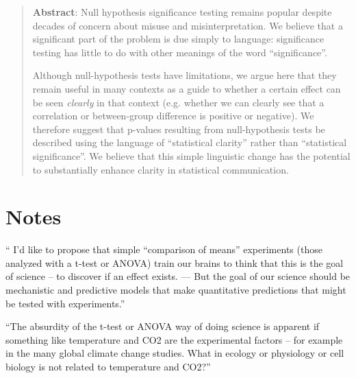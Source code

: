 \begin{abstract}

\textbf{Abstract}: Null hypothesis significance testing remains popular despite decades of concern about misuse and misinterpretation.
We believe that a significant  part of the problem is due simply to language: significance testing has little to do with other meanings of the word ``significance''. 

Although null-hypothesis tests have limitations, we argue here that they remain useful in many contexts as a guide to whether a certain effect can be seen \emph{clearly} in that context (e.g.
whether we can clearly see that a correlation or between-group difference is positive or negative).
We therefore suggest that p-values resulting from null-hypothesis tests be described using the language of ``statistical clarity'' rather than ``statistical significance''.
We believe that this simple linguistic change has the potential to substantially enhance clarity in statistical communication.

\end{abstract}

\flushbottom
\maketitle
\newpage
\thispagestyle{empty}

\section*{Notes}


`` I’d like to propose that simple “comparison of means” experiments (those analyzed with a t-test or ANOVA) train our brains to think that this is the goal of science – to discover if an effect exists. --- But the goal of our science should be mechanistic and predictive models that make quantitative predictions that might be tested with experiments.'' 

``The absurdity of the t-test or  ANOVA way of doing science is apparent if something like temperature and CO2 are the experimental factors – for example in the many global climate change studies. What in ecology or physiology or cell biology is not related to temperature and CO2?''

